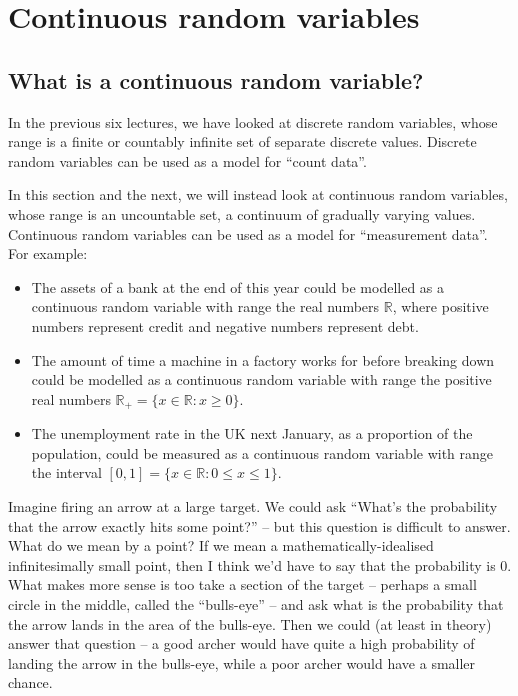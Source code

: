 \documentclass[
  a4paper,
]{book}
\providecommand{\tightlist}{%
  \setlength{\itemsep}{0pt}\setlength{\parskip}{0pt}}
\theoremstyle{definition}
\theoremstyle{definition}
\theoremstyle{definition}
\theoremstyle{definition}
\theoremstyle{remark}
\begin{document}
\hypertarget{L15-continuous}{%
\chapter{Continuous random variables}\label{L15-continuous}}

\hypertarget{continuous-rv}{%
\section{What is a continuous random variable?}\label{continuous-rv}}

In the previous six lectures, we have looked at discrete random variables, whose range is a finite or countably infinite set of separate discrete values. Discrete random variables can be used as a model for ``count data''.

In this section and the next, we will instead look at continuous random variables, whose range is an uncountable set, a continuum of gradually varying values. Continuous random variables can be used as a model for ``measurement data''. For example:

\begin{itemize}
\tightlist
\item
  The assets of a bank at the end of this year could be modelled as a continuous random variable with range the real numbers \(\mathbb R\), where positive numbers represent credit and negative numbers represent debt.
\item
  The amount of time a machine in a factory works for before breaking down could be modelled as a continuous random variable with range the positive real numbers \(\mathbb R_+ = \{x \in \mathbb R : x \geq 0\}\).
\item
  The unemployment rate in the UK next January, as a proportion of the population, could be measured as a continuous random variable with range the interval \([0, 1] = \{x \in \mathbb R : 0 \leq x \leq 1\}\).
\end{itemize}

Imagine firing an arrow at a large target. We could ask ``What's the probability that the arrow exactly hits some point?'' -- but this question is difficult to answer. What do we mean by a point? If we mean a mathematically-idealised infinitesimally small point, then I think we'd have to say that the probability is 0. What makes more sense is too take a section of the target -- perhaps a small circle in the middle, called the ``bulls-eye'' -- and ask what is the probability that the arrow lands in the area of the bulls-eye. Then we could (at least in theory) answer that question -- a good archer would have quite a high probability of landing the arrow in the bulls-eye, while a poor archer would have a smaller chance.
\end{document}
